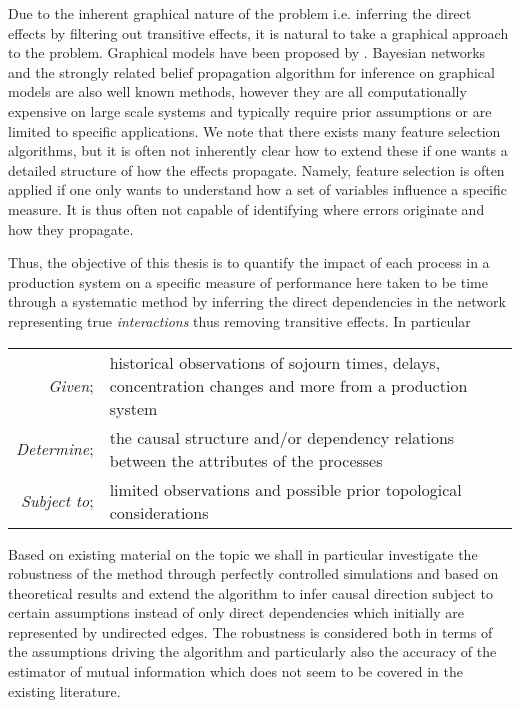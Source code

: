 \documentclass[../Thesis.tex]{subfiles}
\begin{document}
Due to the inherent graphical nature of the problem i.e. inferring the direct effects by filtering out transitive effects, it is natural to take a graphical approach to the problem. Graphical models have been proposed by \cite{1601981848}. Bayesian networks \cite{1581131860} \cite{Inferring_Cellular_Networks_Using_Probabilistic_Graphical_Models} and the strongly related belief propagation algorithm for inference on graphical models \cite{Identification_of_direct_residue_contacts_in_protein-protein_interaction_by_message_passing} are also well known methods, however they are all computationally expensive on large scale systems and typically require prior assumptions or are limited to specific applications. We note that there exists many feature selection algorithms, but it is often not inherently clear how to extend these if one wants a detailed structure of how the effects propagate. Namely, feature selection is often applied if one only wants to understand how a set of variables influence a specific measure. It is thus often not capable of identifying where errors originate and how they propagate.

Thus, the objective of this thesis is to quantify the impact of each process in a production system on a specific measure of performance here taken to be time through a systematic method by inferring the direct dependencies in the network representing true \textit{interactions} thus removing transitive effects. In particular

\begin{table}[h]
    \begin{tabularx}{\textwidth}{rX}
        \textit{Given};      & historical observations of sojourn times, delays, concentration changes and more from a production system\\
        \textit{Determine};  & the causal structure and/or dependency relations between the attributes of the processes                              \\
        \textit{Subject to}; & limited observations and possible prior topological considerations                                                    \\
    \end{tabularx}
\end{table}

Based on existing material on the topic \cite{Network-deconvolution-as-a-general-method-to-distinguish-direct-dependencies-in-networks} \cite{Nonparametric-copula-entropy-and-network-deconvolution-method-for-causal-discovery-in-complex-manufacturing-systems} \cite{An_effective_approach_for_causal_variables_analysis_in_diesel_engine_production_by_using_mutual_information_and_network_deconvolution} we shall in particular investigate the robustness of the method through perfectly controlled simulations and based on theoretical results and extend the algorithm to infer causal direction subject to certain assumptions instead of only direct dependencies which initially are represented by undirected edges. The robustness is considered both in terms of the assumptions driving the algorithm and particularly also the accuracy of the estimator of mutual information which does not seem to be covered in the existing literature.
\end{document}
